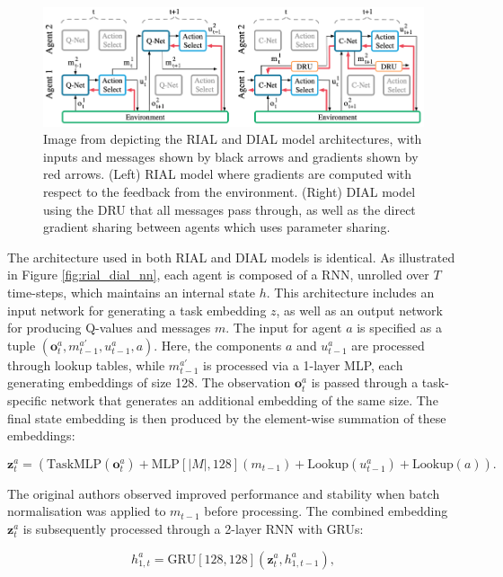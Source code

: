 \documentclass{article}
\begin{document}
\

\begin{figure}
	\centering
	\includegraphics[scale=0.5]{images/rial_dial.png}
	\caption{Image from \citet{foerster2016learning} depicting the RIAL and DIAL model architectures, with inputs and messages shown by black arrows and gradients shown by red arrows. (Left) RIAL model where gradients are computed with respect to the feedback from the environment. (Right) DIAL model using the DRU that all messages pass through, as well as the direct gradient sharing between agents which uses parameter sharing.}
\end{figure}

The architecture used in both RIAL and DIAL models is identical. As illustrated in Figure \ref{fig:rial_dial_nn}, each agent is composed of a RNN, unrolled over \( T \) time-steps, which maintains an internal state \( h \). This architecture includes an input network for generating a task embedding \( z \), as well as an output network for producing Q-values and messages \( m \). The input for agent \( a \) is specified as a tuple \( (\mathbf{o}_t^a, m_{t-1}^{a'}, u_{t-1}^a, a) \). Here, the components \( a \) and \( u_{t-1}^a \) are processed through lookup tables, while \( m_{t-1}^{a'} \) is processed via a 1-layer MLP, each generating embeddings of size 128. The observation \( \mathbf{o}_t^a \) is passed through a task-specific network that generates an additional embedding of the same size. The final state embedding is then produced by the element-wise summation of these embeddings:

$$
\mathbf{z}_t^a = (\text{TaskMLP}(\mathbf{o}_t^a) + \text{MLP}[|M|, 128](m_{t-1}) + \text{Lookup}(u_{t-1}^a) + \text{Lookup}(a)).
$$

The original authors observed improved performance and stability when batch normalisation \citep{ioffe2015batch} was applied to \( m_{t-1} \) before processing. The combined embedding \( \mathbf{z}_t^a \) is subsequently processed through a 2-layer RNN with GRUs:

$$
h_{1, t}^a = \text{GRU}[128, 128](\mathbf{z}_t^a, h_{1, t-1}^a),
$$
\end{document}
